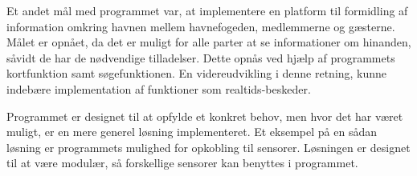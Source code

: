 
Et andet mål med programmet var, at implementere en platform til formidling af information omkring havnen mellem havnefogeden, medlemmerne og gæsterne. Målet er opnået, da det er muligt for alle parter at se informationer om hinanden, såvidt de har de nødvendige tilladelser. Dette opnås ved hjælp af programmets kortfunktion samt søgefunktionen. En videreudvikling i denne retning, kunne indebære implementation af funktioner som realtids-beskeder.


Programmet er designet til at opfylde et konkret behov, men hvor det har været muligt, er en mere generel løsning implementeret. Et eksempel på en sådan løsning er programmets mulighed for opkobling til sensorer. Løsningen er designet til at være modulær, så forskellige sensorer kan benyttes i programmet.


